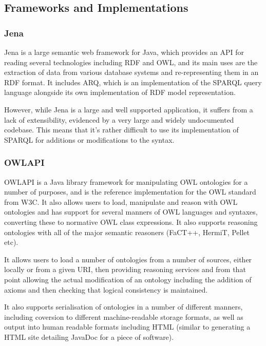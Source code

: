 \documentclass{article}
\begin{document}
\subsection{Frameworks and Implementations} 

\subsubsection{Jena}

Jena\cite{jena} is a large semantic web framework for Java, which provides an API for
reading several technologies including RDF and OWL, and its main uses are
the extraction of data from various database systems and re-representing them in
an RDF format. It includes ARQ\cite{arq}, which is an implementation of the SPARQL query language
alongside its own implementation of RDF model representation.\cite{jenardf}

However, while Jena is a large and well supported application, it suffers 
from a lack of extensibility, evidenced by a very large and widely undocumented 
codebase. This means that it's rather difficult to use its implementation of
SPARQL for additions or modifications to the syntax.

\subsubsection{OWLAPI}

OWLAPI is a Java library framework for manipulating OWL ontologies for a number of
purposes, and is the reference implementation for the OWL standard from W3C. 
It also allows users to load, manipulate and reason with OWL ontologies and has 
support for several manners of OWL languages and syntaxes, converting these to 
normative OWL class expressions. It also supports reasoning ontologies with all
of the major semantic reasoners (FaCT++, HermiT, Pellet etc).

It allows users to load a number of ontologies from a number of sources, either
locally or from a given URI, then providing reasoning services and from that
point allowing the actual modification of an ontology including the addition of
axioms and then checking that logical consistency is maintained.

It also supports serialisation of ontologies in a number of different manners,
including coversion to different machine-readable storage formats, as well as
output into human readable formats including HTML (similar to generating a HTML
site detailing JavaDoc for a piece of software).
\end{document}
